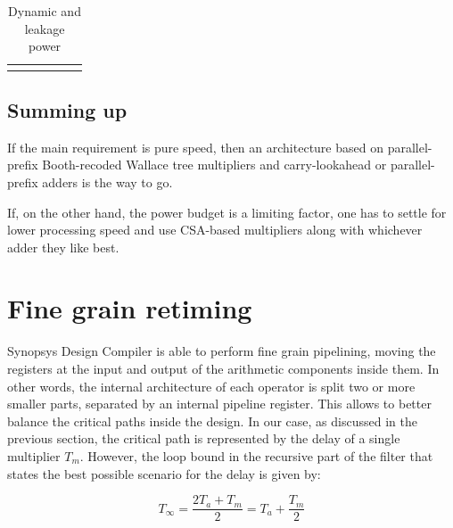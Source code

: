 \documentclass[a4paper]{article}
\begin{document}
\begin{table}[hbtp]
\begin{tabular}{clllll}
																			 &                                                    &                                                                          &                                                                          &                                                                          &
	\end{tabular}
	\caption{Dynamic and leakage power}
	\label{tab:pwr}
\end{table}

\subsection{Summing up}
If the main requirement is pure speed, then an architecture based on parallel-prefix Booth-recoded Wallace tree multipliers and carry-lookahead or parallel-prefix adders is the way to go.

If, on the other hand, the power budget is a limiting factor, one has to settle for lower processing speed and use CSA-based multipliers along with whichever adder they like best.

\section{Fine grain retiming}
Synopsys Design Compiler is able to perform fine grain pipelining, moving the registers at the input and output of the arithmetic components inside them. In other words, the internal architecture of each operator is split two or more smaller parts, separated by an internal pipeline register. This allows to better balance the critical paths inside the design. In our case, as discussed in the previous section, the critical path is represented by the delay of a single multiplier $T_m$. However, the loop bound in the recursive part of the filter that states the best possible scenario for the delay is given by:

\begin{equation*}
	T_\infty = \frac{2T_a + T_m}{2} = T_a + \frac{T_m}{2}
\end{equation*}
\end{document}
